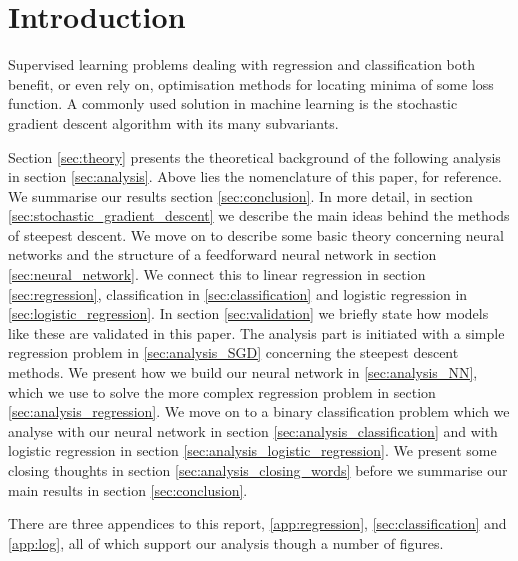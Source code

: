 \section{Introduction}\label{sec:introduction}


Supervised learning problems dealing with regression and classification both benefit, or even rely on, optimisation methods for locating minima of some loss function. A commonly used solution in machine learning is the stochastic gradient descent algorithm with its many subvariants. 


\fillertext


Section \ref{sec:theory} presents the theoretical background of the following analysis in section \ref{sec:analysis}. Above lies the nomenclature of this paper, for reference. We summarise our results section \ref{sec:conclusion}. In more detail, in section \ref{sec:stochastic_gradient_descent} we describe the main ideas behind the methods of steepest descent. We move on to describe some basic theory concerning neural networks and the structure of a feedforward neural network in section \ref{sec:neural_network}. We connect this to linear regression in section \ref{sec:regression}, classification in \ref{sec:classification} and logistic regression in \ref{sec:logistic_regression}. In section \ref{sec:validation} we briefly state how models like these are validated in this paper. The analysis part is initiated with a simple regression problem in \ref{sec:analysis_SGD} concerning the steepest descent methods. We present how we build our neural network in \ref{sec:analysis_NN}, which we use to solve the more complex regression problem in section \ref{sec:analysis_regression}. We move on to a binary classification problem which we analyse with our neural network in section \ref{sec:analysis_classification} and with logistic regression in section \ref{sec:analysis_logistic_regression}. We present some closing thoughts  in section \ref{sec:analysis_closing_words} before we summarise our main results in section \ref{sec:conclusion}.

There are three appendices to this report, \ref{app:regression}, \ref{sec:classification} and \ref{app:log}, all of which support our analysis though a number of figures.